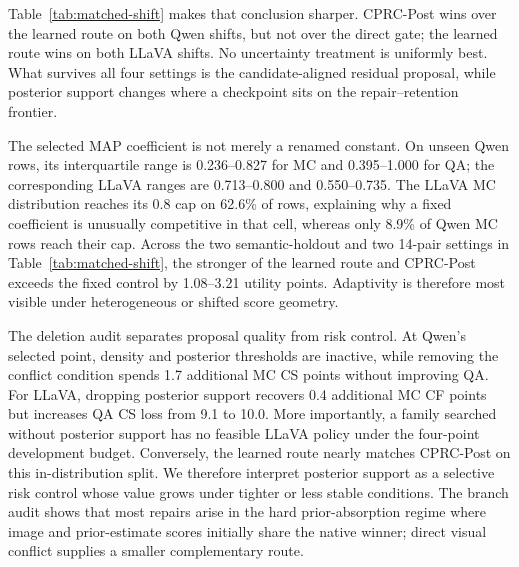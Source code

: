 \documentclass[letterpaper]{article}
\begin{document}
Table~\ref{tab:matched-shift} makes that conclusion sharper. CPRC-Post wins over
the learned route on both Qwen shifts, but not over the direct gate; the learned route wins on
both LLaVA shifts. No uncertainty treatment is uniformly best. What survives
all four settings is the candidate-aligned residual proposal, while posterior
support changes where a checkpoint sits on the repair--retention frontier.

The selected MAP coefficient is not merely a renamed constant. On unseen Qwen
rows, its interquartile range is 0.236--0.827 for MC and 0.395--1.000 for QA;
the corresponding LLaVA ranges are 0.713--0.800 and 0.550--0.735. The LLaVA MC
distribution reaches its 0.8 cap on 62.6\% of rows, explaining why a fixed
coefficient is unusually competitive in that cell, whereas only 8.9\% of Qwen
MC rows reach their cap. Across the two semantic-holdout and two 14-pair
settings in Table~\ref{tab:matched-shift}, the stronger of the learned route and
CPRC-Post exceeds the fixed control by 1.08--3.21 utility points. Adaptivity is
therefore most visible under heterogeneous or shifted score geometry.

The deletion audit separates proposal quality from risk control. At Qwen's
selected point, density and posterior thresholds are inactive, while removing
the conflict condition spends 1.7 additional MC CS points without improving QA.
For LLaVA, dropping posterior support recovers 0.4 additional MC CF points but
increases QA CS loss from 9.1 to 10.0. More importantly, a family searched
without posterior support has no feasible LLaVA policy under the four-point
development budget. Conversely, the learned route nearly matches CPRC-Post on this
in-distribution split. We therefore interpret posterior support as
a selective risk control whose value grows under tighter or less stable
conditions. The branch audit shows that
most repairs arise in the hard prior-absorption regime where image and prior-estimate
scores initially share the native winner; direct visual conflict supplies a
smaller complementary route.
\end{document}
